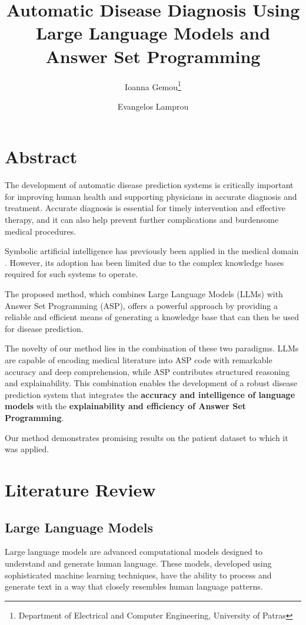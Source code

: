 \documentclass[10pt,leqno]{amsart}
\title{Automatic Disease Diagnosis Using Large Language Models and Answer Set Programming}
\author{Ioanna Gemou\thanks{Department of Electrical and Computer Engineering, University of Patras} \\ \src{ioannagemou@upnet.gr} \and Evangelos Lamprou\footnotemark[1] \\ \src{e.lamprou@upnet.gr}}
\begin{document}
\maketitle
\section{Abstract}
The development of automatic disease prediction systems is critically important for improving human health and supporting physicians in accurate diagnosis and treatment. Accurate diagnosis is essential for timely intervention and effective therapy, and it can also help prevent further complications and burdensome medical procedures.

Symbolic artificial intelligence has previously been applied in the medical domain \cite{Alviano_2020}. However, its adoption has been limited due to the complex knowledge bases required for such systems to operate.

The proposed method, which combines Large Language Models (LLMs) with Answer Set Programming (ASP), offers a powerful approach by providing a reliable and efficient means of generating a knowledge base that can then be used for disease prediction.

The novelty of our method lies in the combination of these two paradigms. LLMs are capable of encoding medical literature into ASP code with remarkable accuracy and deep comprehension, while ASP contributes structured reasoning and explainability. This combination enables the development of a robust disease prediction system that integrates the \textbf{accuracy and intelligence of language models} with the \textbf{explainability and efficiency of Answer Set Programming}.

Our method demonstrates promising results on the patient dataset to which it was applied.

\section{Literature Review}

\subsection{Large Language Models}

Large language models \cite{zhao2023survey} are advanced computational models designed to understand and generate human language. These models, developed using sophisticated machine learning techniques, have the ability to process and generate text in a way that closely resembles human language patterns.
\end{document}

